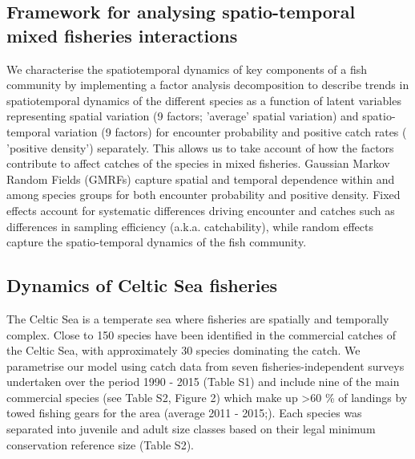 \documentclass{nature}
\begin{document}
\begin{linenumbers}
\subsection{Framework for analysing spatio-temporal mixed fisheries
	interactions}

 We  characterise
the spatiotemporal dynamics of key components of a fish community by 
implementing a factor analysis decomposition to describe trends in spatiotemporal
dynamics of the different species as a function of latent variables
\cite{Thorson2015} representing spatial variation (9 factors;  'average' spatial variation) and spatio-temporal variation (9
factors) for encounter probability and positive catch rates ( 'positive density') separately\cite{Thorson2015a}. This
	allows us to  take account of how the factors contribute to
affect catches of the species in mixed fisheries.  Gaussian
Markov Random Fields (GMRFs)  capture spatial and temporal dependence
within and among species groups for both encounter probability and positive
density\cite{Thorson2013}.  Fixed effects  account for systematic differences driving
encounter and catches such as differences in sampling efficiency (a.k.a.
catchability), while random effects capture the spatio-temporal dynamics of the
fish community.

\subsection{Dynamics of Celtic Sea fisheries}


The Celtic Sea is a temperate sea where fisheries are spatially and temporally
complex\cite{Ellis2000, Gerritsen2012}. Close to 150
species have been identified in the commercial catches of the Celtic Sea, with
approximately 30 species dominating the catch\cite{Mateo2016}. We parametrise
our  model using catch data from seven
fisheries-independent surveys undertaken  over the
period 1990 - 2015 (Table S1) and include nine of the main commercial species
(see Table S2, Figure 2)  which make up \textgreater 60 \%
of landings by towed fishing gears for the area (average 2011 -
2015;\cite{STECF2017}). Each species was separated into juvenile and adult size
classes based on their legal minimum conservation reference size (Table S2).




\end{linenumbers}
\end{document}
